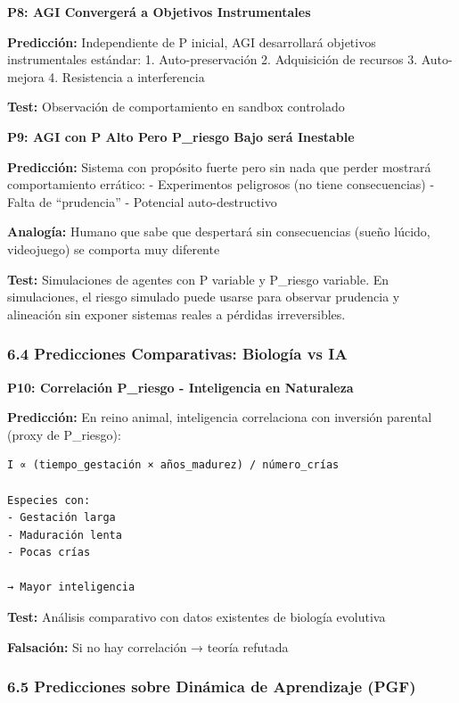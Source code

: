 \textbf{P8: AGI Convergerá a Objetivos Instrumentales}

\textbf{Predicción:} Independiente de P inicial, AGI desarrollará
objetivos instrumentales estándar: 1. Auto-preservación 2. Adquisición
de recursos 3. Auto-mejora 4. Resistencia a interferencia

\textbf{Test:} Observación de comportamiento en sandbox controlado

\textbf{P9: AGI con P Alto Pero P\_riesgo Bajo será Inestable}

\textbf{Predicción:} Sistema con propósito fuerte pero sin nada que
perder mostrará comportamiento errático: - Experimentos peligrosos (no
tiene consecuencias) - Falta de ``prudencia'' - Potencial
auto-destructivo

\textbf{Analogía:} Humano que sabe que despertará sin consecuencias
(sueño lúcido, videojuego) se comporta muy diferente

\textbf{Test:} Simulaciones de agentes con P variable y P\_riesgo
variable. En simulaciones, el riesgo simulado puede usarse para observar
prudencia y alineación sin exponer sistemas reales a pérdidas
irreversibles.

\subsubsection{6.4 Predicciones Comparativas: Biología vs
IA}\label{predicciones-comparativas-biologuxeda-vs-ia}

\textbf{P10: Correlación P\_riesgo - Inteligencia en Naturaleza}

\textbf{Predicción:} En reino animal, inteligencia correlaciona con
inversión parental (proxy de P\_riesgo):

\begin{verbatim}
I ∝ (tiempo_gestación × años_madurez) / número_crías

Especies con:
- Gestación larga
- Maduración lenta  
- Pocas crías

→ Mayor inteligencia
\end{verbatim}

\textbf{Test:} Análisis comparativo con datos existentes de biología
evolutiva

\textbf{Falsación:} Si no hay correlación → teoría refutada

\subsubsection{6.5 Predicciones sobre Dinámica de Aprendizaje
(PGF)}\label{predicciones-sobre-dinuxe1mica-de-aprendizaje-pgf}

